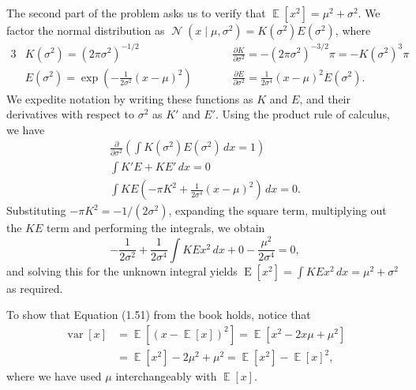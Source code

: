 \documentclass[12pt, a4paper]{article}
\DeclareMathOperator{\N}{\mathcal{N}}
\DeclareMathOperator{\E}{\mathbb{E}}
\DeclareMathOperator{\var}{\operatorname{var}}
\begin{document}
The second part of the problem asks us to verify that $\E \left[ x^2 \right] = \mu^2 + \sigma^2$.
We factor the normal distribution as $\N\left( x \mid \mu, \sigma^2\right) = K(\sigma^2) E(\sigma^2)$, where
\begin{alignat*}{3}
	& K(\sigma^2) = \left( 2 \pi \sigma^2 \right)^{-1/2} 
	&& \qquad \frac{\partial K}{\partial \sigma^2} = - \left( 2 \pi \sigma^2 \right)^{-3/2} \pi = -K(\sigma^2)^3 \pi \\
	& E(\sigma^2) = \exp \left( - \frac{1}{2 \sigma^2} \left( x - \mu \right)^2 \right)
	&& \qquad \frac{\partial E}{\partial \sigma^2} = \frac{1}{2\sigma^4} \left( x - \mu\right)^2 E(\sigma^2).
\end{alignat*}
We expedite notation by writing these functions as $K$ and $E$, and their derivatives with respect to $\sigma^2$ as $K'$ and $E'$.
Using the product rule of calculus, we have
\begin{gather*}
	\frac{\partial}{\partial \sigma^2} \left( \int K(\sigma^2) E(\sigma^2) \, dx = 1 \right) \\
	\int K' E + K E' \, dx = 0 \\
	\int KE \left( -\pi K^2 + \frac{1}{2 \sigma^4} (x - \mu)^2 \right) \, dx = 0.
\end{gather*}
Substituting $- \pi K^2 = - 1 / (2 \sigma^2)$, expanding the square term, multiplying out the $KE$ term and performing the integrals, we obtain
\begin{equation*}
	-\frac{1}{2\sigma^2} + \frac{1}{2 \sigma^4} \int KE x^2 \, dx + 0 - \frac{\mu^2}{2 \sigma^4} = 0,
\end{equation*}
and solving this for the unknown integral yields $\operatorname{E}\left[x^2\right] = \int KE x^2 \, dx = \mu^2 + \sigma^2$
as required.

To show that Equation (1.51) from the book holds, notice that
\begin{align*}
	\var \left[ x \right] &= \E\left[ (x - \E\left[x\right])^2\right] 
	= \E\left[ x^2 - 2 x \mu + \mu ^2\right] \\
	&= \E\left[ x^2\right] - 2 \mu^2 + \mu^2 
	= \E\left[ x^2\right] - \E\left[ x\right]^2,
\end{align*}
where we have used $\mu$ interchangeably with $\E\left[ x\right]$. 
\end{document}
